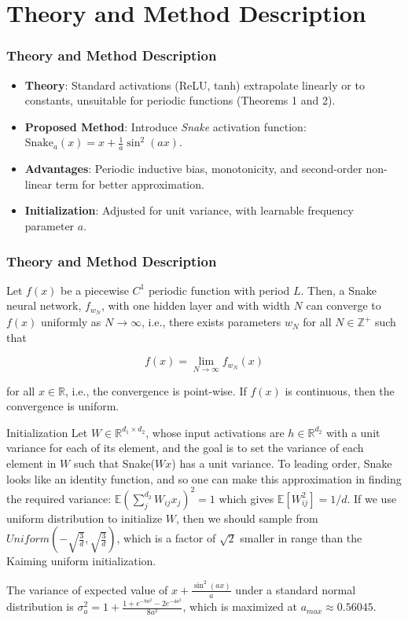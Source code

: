 \documentclass[aspectratio=169, 12pt]{beamer}
\begin{document}
\section{Theory and Method Description}
\begin{frame}
\frametitle{Theory and Method Description}
\begin{itemize}
    \item \textbf{Theory}: Standard activations (ReLU, tanh) extrapolate linearly or to constants, unsuitable for periodic functions (Theorems 1 and 2).
    \item \textbf{Proposed Method}: Introduce \textit{Snake} activation function: \( \text{Snake}_a(x) = x + \frac{1}{a} \sin^2(ax) \).
    \item \textbf{Advantages}: Periodic inductive bias, monotonicity, and second-order non-linear term for better approximation.
    \item \textbf{Initialization}: Adjusted for unit variance, with learnable frequency parameter \( a \).
\end{itemize}
\end{frame}

\begin{frame}
\frametitle{Theory and Method Description}
\begin{theorem}
    Let $f(x)$ be a piecewise $C^{1}$ periodic function with period $L$. Then, a Snake neural network, $f_{w_{N}}$, with one hidden layer and with width $N$ can converge to $f(x)$ uniformly as $N \rightarrow \infty$, i.e., there exists parameters $w_{N}$ for all $N \in \mathbb{Z}^{+}$ such that

    $$ f(x) = \lim_{N \rightarrow \infty} f_{w_{N}}(x) $$

    for all $x \in \mathbb{R}$, i.e., the convergence is point-wise. If $f(x)$ is continuous, then the convergence is uniform.
\end{theorem}
\end{frame}

\begin{frame}{Initialization}
     Let $W \in \mathbb{R}^{d_{1} \times d_{2}}$, whose input activations are $h \in \mathbb{R}^{d_{2}}$ with a unit variance for each of its element, and the goal is to set the variance of each element in $W$ such that Snake($Wx$) has a unit variance. To leading order, Snake looks like an identity function, and so one can make this approximation in finding the required variance: $\mathbb{E} \left( \sum_{j}^{d_{2}} W_{ij} x_{j} \right)^{2} = 1$ which gives $\mathbb{E}[W_{ij}^{2}] = 1/d$. If we use uniform distribution to initialize $W$, then we should sample from $Uniform(-\sqrt{\frac{3}{d}}, \sqrt{\frac{3}{d}})$, which is a factor of $\sqrt{2}$ smaller in range than the Kaiming uniform initialization.

 The variance of expected value of $x + \frac{\sin^{2}(ax)}{a}$ under a standard normal distribution is $\sigma_{a}^{2} = 1 + \frac{1 + e^{-8a^{2}} - 2e^{-4a^{2}}}{8a^{2}}$, which is maximized at $a_{max} \approx 0.56045$.

\end{frame}
\end{document}
